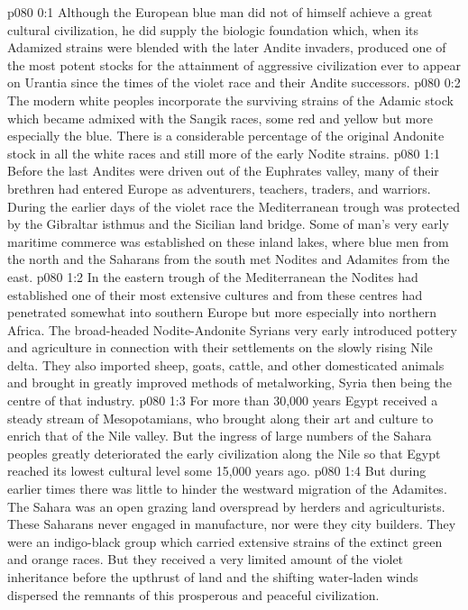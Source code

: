 \author{Archangel}
\vs p080 0:1 Although the European blue man did not of himself achieve a great cultural civilization, he did supply the biologic foundation which, when its Adamized strains were blended with the later Andite invaders, produced one of the most potent stocks for the attainment of aggressive civilization ever to appear on Urantia since the times of the violet race and their Andite successors.
\vs p080 0:2 The modern white peoples incorporate the surviving strains of the Adamic stock which became admixed with the Sangik races, some red and yellow but more especially the blue. There is a considerable percentage of the original Andonite stock in all the white races and still more of the early Nodite strains.
\vs p080 1:1 Before the last Andites were driven out of the Euphrates valley, many of their brethren had entered Europe as adventurers, teachers, traders, and warriors. During the earlier days of the violet race the Mediterranean trough was protected by the Gibraltar isthmus and the Sicilian land bridge. Some of man’s very early maritime commerce was established on these inland lakes, where blue men from the north and the Saharans from the south met Nodites and Adamites from the east.
\vs p080 1:2 In the eastern trough of the Mediterranean the Nodites had established one of their most extensive cultures and from these centres had penetrated somewhat into southern Europe but more especially into northern Africa. The broad\hyp{}headed Nodite\hyp{}Andonite Syrians very early introduced pottery and agriculture in connection with their settlements on the slowly rising Nile delta. They also imported sheep, goats, cattle, and other domesticated animals and brought in greatly improved methods of metalworking, Syria then being the centre of that industry.
\vs p080 1:3 For more than 30,000 years Egypt received a steady stream of Mesopotamians, who brought along their art and culture to enrich that of the Nile valley. But the ingress of large numbers of the Sahara peoples greatly deteriorated the early civilization along the Nile so that Egypt reached its lowest cultural level some 15,000 years ago.
\vs p080 1:4 But during earlier times there was little to hinder the westward migration of the Adamites. The Sahara was an open grazing land overspread by herders and agriculturists. These Saharans never engaged in manufacture, nor were they city builders. They were an indigo\hyp{}black group which carried extensive strains of the extinct green and orange races. But they received a very limited amount of the violet inheritance before the upthrust of land and the shifting water\hyp{}laden winds dispersed the remnants of this prosperous and peaceful civilization.
